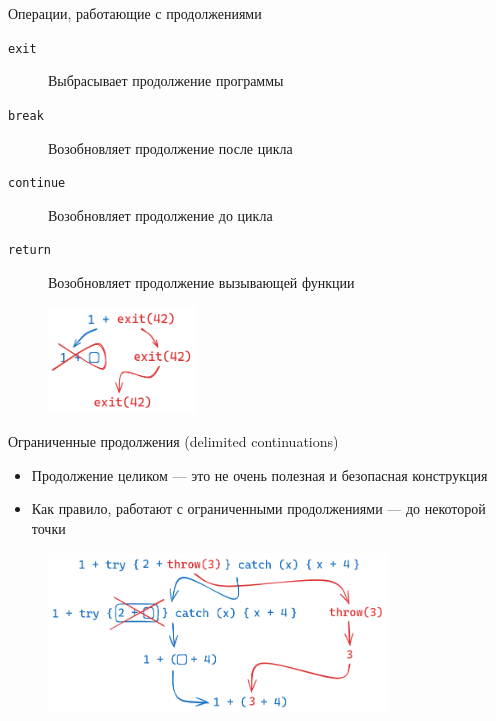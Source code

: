    \begin{frame}[fragile]{Операции, работающие с продолжениями}
        \vspace{1em}
        \begin{description}
            \item[\texttt{exit}] Выбрасывает продолжение программы
            \item[\texttt{break}] Возобновляет продолжение после цикла
            \item[\texttt{continue}] Возобновляет продолжение до цикла
            \item[\texttt{return}] Возобновляет продолжение вызывающей функции
        \end{description}
        \begin{figure}[h]
            \centering
            \includegraphics[width=0.35\textwidth]{figs/cont-exit}
        \end{figure}
    \end{frame}

    \begin{frame}[fragile]{Ограниченные продолжения (delimited continuations)}
        \begin{itemize}
            \item Продолжение целиком --- это не очень полезная и безопасная конструкция
            \item Как правило, работают с ограниченными продолжениями --- до некоторой точки
        \end{itemize}
        \begin{figure}[h]
            \centering
            \includegraphics[width=0.8\textwidth]{figs/cont-try-catch}
        \end{figure}
    \end{frame}

